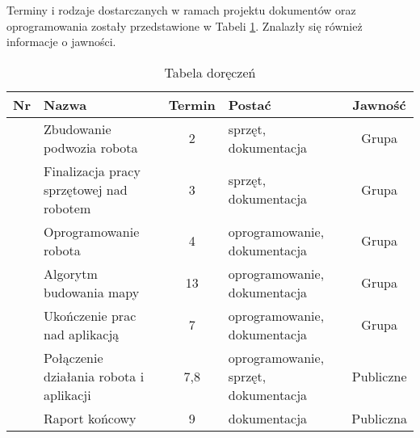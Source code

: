 
Terminy i rodzaje dostarczanych w ramach projektu dokumentów oraz oprogramowania zostały przedstawione w Tabeli \ref{tabela_doreczenie}. Znalazły się również informacje o jawności.


\newcommand\rownumber{\stepcounter{rownumbercounter}\arabic{rownumbercounter}}

\begin{table}[h]
	\centering
	\begin{tabularx}{\linewidth}{|c|X|c|X|c|}
		\hline 
		Nr & Nazwa & Termin & Postać & Jawność \\ \hline
		 \rownumber & Zbudowanie podwozia robota & 2 & sprzęt, dokumentacja & Grupa \\ \hline
		 \rownumber & Finalizacja pracy sprzętowej nad robotem & 3 & sprzęt, dokumentacja & Grupa \\ \hline
		 \rownumber & Oprogramowanie robota & 4 & oprogramowanie, dokumentacja & Grupa \\ \hline
		 \rownumber & Algorytm budowania mapy & 13 & oprogramowanie, dokumentacja & Grupa \\ \hline
		 \rownumber & Ukończenie prac nad aplikacją & 7 & oprogramowanie, dokumentacja & Grupa \\ \hline
		 \rownumber & Połączenie działania robota i aplikacji & 7,8 & oprogramowanie, sprzęt, dokumentacja & Publiczne \\ \hline
		 \rownumber & Raport końcowy & 9 & dokumentacja & Publiczna \\ \hline
		 
	\end{tabularx}
	\caption{Tabela doręczeń}
	\label{tabela_doreczenie}
\end{table}